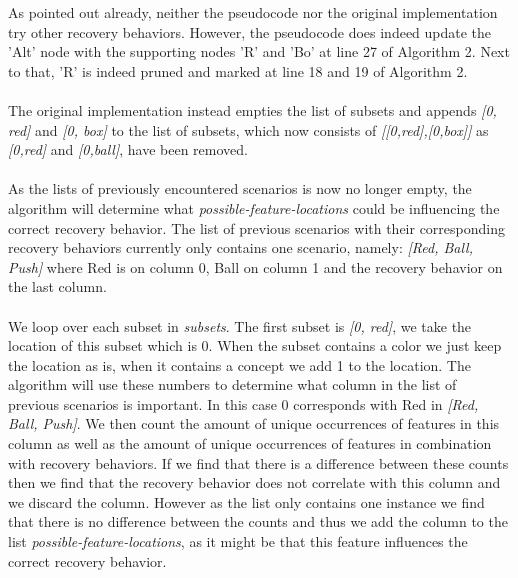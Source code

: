 \documentclass{article}
\begin{document}
\begin{quote}
\textit{}
\end{quote}
As pointed out already, neither the pseudocode nor the original implementation try other recovery behaviors. However, the pseudocode does indeed update the 'Alt' node with the supporting nodes 'R' and 'Bo' at line 27 of Algorithm 2. Next to that, 'R' is indeed pruned and marked at line 18 and 19 of Algorithm 2. 
\\\\
The original implementation instead empties the list of subsets and appends \textit{[0, red]} and \textit{[0, box]} to the list of subsets, which now consists of \textit{[[0,red],[0,box]]} as \textit{[0,red]} and \textit{[0,ball]}, have been removed. 
\\\\
As the lists of previously encountered scenarios is now no longer empty, the algorithm will determine what \textit{possible-feature-locations} could be influencing the correct recovery behavior. The list of previous scenarios with their corresponding recovery behaviors currently only contains one scenario, namely: \textit{[Red, Ball, Push]} where Red is on column 0, Ball on column 1 and the recovery behavior on the last column. 
\\\\
We loop over each subset in \textit{subsets}. The first subset is \textit{[0, red]}, we take the location of this subset which is 0. When the subset contains a color we just keep the location as is, when it contains a concept we add 1 to the location. The algorithm will use these numbers to determine what column in the list of previous scenarios is important. In this case 0 corresponds with Red in \textit{[Red, Ball, Push]}. We then count the amount of unique occurrences of features in this column as well as the amount of unique occurrences of features in combination with recovery behaviors. If we find that there is a difference between these counts then we find that the recovery behavior does not correlate with this column and we discard the column. However as the list only contains one instance we find that there is no difference between the counts and thus we add the column to the list \textit{possible-feature-locations}, as it might be that this feature influences the correct recovery behavior.
\end{document}
